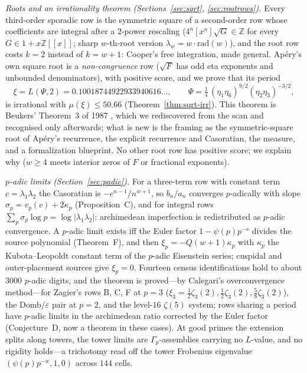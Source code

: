 \emph{Roots and an irrationality theorem (Sections~\ref{sec:sqrt}, \ref{sec:rootrows}).} Every third-order sporadic row is the symmetric square of a second-order row whose coefficients are integral after a $2$-power rescaling ($4^n[x^n]\sqrt G\in\mathbb Z$ for every $G\in1+x\mathbb Z[[x]]$; sharp $w$-th-root version $\lambda_w=w\cdot\mathrm{rad}(w)$), and the root row costs $k=2$ instead of $k=w+1$: Cooper's free integration, made general. Ap\'ery's own square root is a \emph{non-congruence} row ($\sqrt{F}$ has odd eta exponents and unbounded denominators), with positive score, and we prove that its period
\[
\xi=L(\Psi,2)=0.10018744922933940616\ldots,\qquad \Psi=\tfrac14\,(\eta_1\eta_6)^{9/2}(\eta_2\eta_3)^{-3/2},
\]
is irrational with $\mu(\xi)\le50.66$ (Theorem~\ref{thm:sqrt-irr}). This theorem is Beukers' Theorem~3 of 1987 \cite{Beukers1987}, which we rediscovered from the scan and recognised only afterwards; what is new is the framing as the symmetric-square root of Ap\'ery's recurrence, the explicit recurrence and Casoratian, the measure, and a formalization blueprint. No other root row has positive score; we explain why ($w\ge4$ meets interior zeros of $F$ or fractional exponents).

\emph{$p$-adic limits (Section~\ref{sec:padic}).} For a three-term row with constant term $c=\lambda_1\lambda_2$ the Casoratian is $-c^{n-1}/n^{w+1}$, so $b_n/a_n$ converges $p$-adically with slope $\sigma_p=v_p(c)+2\kappa_p$ (Proposition~C), and for integral rows $\sum_p\sigma_p\log p=\log|\lambda_1\lambda_2|$: archimedean imperfection is redistributed as $p$-adic convergence. A $p$-adic limit exists iff the Euler factor $1-\psi(p)p^{-s}$ divides the source polynomial (Theorem~F), and then $\xi_p=-Q(w+1)\kappa_p$ with $\kappa_p$ the Kubota--Leopoldt constant term of the $p$-adic Eisenstein series; cuspidal and outer-placement sources give $\xi_p=0$. Fourteen census identifications hold to about $3000$ $p$-adic digits, and the theorem is proved---by Calegari's overconvergence method---for Zagier's rows B, C, F at $p=3$ ($\xi_3=\tfrac12\zeta_3(2),\tfrac12\zeta_3(2),\tfrac58\zeta_3(2)$), the Domb/$\varepsilon$ pair at $p=2$, and the level-$16$ $\zeta(5)$ system; rows sharing a period have $p$-adic limits in the archimedean ratio corrected by the Euler factor (Conjecture~D, now a theorem in these cases). At good primes the extension splits along towers, the tower limits are $\Gamma_p$-assemblies carrying no $L$-value, and no rigidity holds---a trichotomy read off the tower Frobenius eigenvalue $(\psi(p)p^{-w},1,0)$ across $144$ cells.

